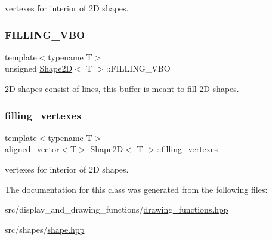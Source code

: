 vertexes for interior of 2D shapes. \mbox{\label{classShape2D_a220cf4cf96da8bd43627ffffd00a0718}} 
\subsubsection{\texorpdfstring{F\+I\+L\+L\+I\+N\+G\+\_\+\+V\+BO}{FILLING\_VBO}}
{\footnotesize\ttfamily template$<$typename T$>$ \\
unsigned \mbox{\hyperlink{classShape2D}{Shape2D}}$<$ T $>$\+::F\+I\+L\+L\+I\+N\+G\+\_\+\+V\+BO\hspace{0.3cm}{\ttfamily [protected]}}

2D shapes consist of lines, this buffer is meant to fill 2D shapes. \mbox{\label{classShape2D_ae3e216c9d8422b47f46bff9259bd17be}} 
\subsubsection{\texorpdfstring{filling\+\_\+vertexes}{filling\_vertexes}}
{\footnotesize\ttfamily template$<$typename T$>$ \\
\mbox{\hyperlink{type__definitions_8hpp_a087efd587d66b881646ef378f1919c90}{aligned\+\_\+vector}}$<$T$>$ \mbox{\hyperlink{classShape2D}{Shape2D}}$<$ T $>$\+::filling\+\_\+vertexes\hspace{0.3cm}{\ttfamily [protected]}}

vertexes for interior of 2D shapes. 

The documentation for this class was generated from the following files\+:\begin{DoxyCompactItemize}
\item 
src/display\+\_\+and\+\_\+drawing\+\_\+functions/\mbox{\hyperlink{drawing__functions_8hpp}{drawing\+\_\+functions.\+hpp}}\item 
src/shapes/\mbox{\hyperlink{shape_8hpp}{shape.\+hpp}}\end{DoxyCompactItemize}
